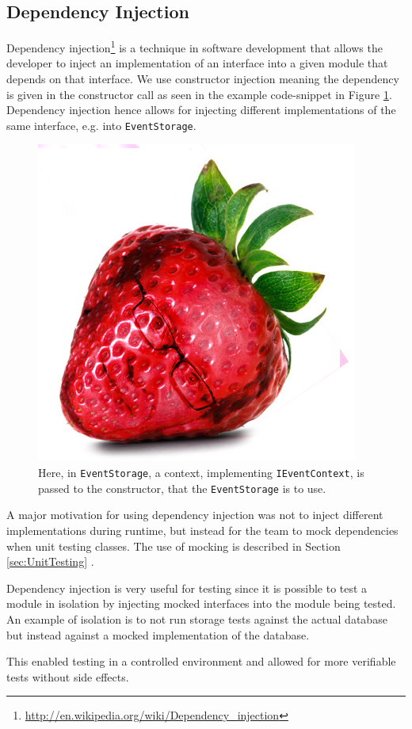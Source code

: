 \subsection{Dependency Injection}
Dependency injection\footnote{\url{http://en.wikipedia.org/wiki/Dependency_injection}} is a technique in software development that allows the developer to inject an implementation of an interface into a given module that depends on that interface. We use constructor injection meaning the dependency is given in the constructor call as seen in the example code-snippet in Figure \ref{fig:DependencyInjection}. Dependency injection hence allows for injecting different implementations of the same interface, e.g. into \texttt{EventStorage}.

\begin{figure}[h!]
\centering
\includegraphics[width=0.3\linewidth]{figures/strawberry}
\caption{\label{fig:DependencyInjection}Here, in \texttt{EventStorage}, a context, implementing \texttt{IEventContext}, is passed to the constructor, that the \texttt{EventStorage} is to use.  }
\end{figure}

A major motivation for using dependency injection was not to inject different implementations during runtime, but instead for the team to mock dependencies when unit testing classes. The use of mocking is described in Section \ref{sec:UnitTesting} .

Dependency injection is very useful for testing since it is possible to test a module in isolation by injecting mocked interfaces into the module being tested. An example of isolation is to not run storage tests against the actual database but instead against a mocked implementation of the database. 

This enabled testing in a controlled environment and allowed for more verifiable tests without side effects.